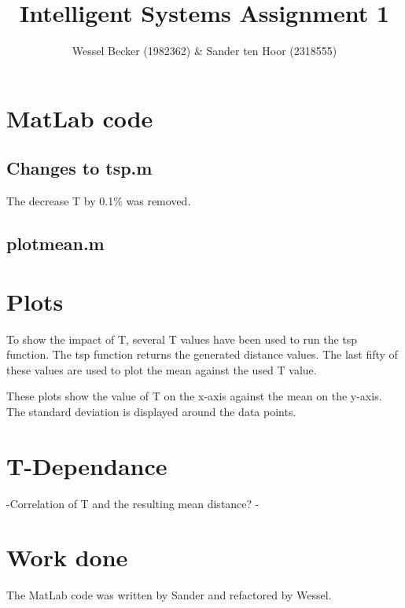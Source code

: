 \documentclass[10pt,a4paper]{article}
\begin{document}
\title{Intelligent Systems Assignment 1}
\author{Wessel Becker (1982362) \& Sander ten Hoor (2318555)}
\maketitle
\section{MatLab code}
\subsection{Changes to tsp.m}
The decrease T by 0.1\% was removed.

\subsection{plotmean.m}


\section{Plots}
To show the impact of T, several T values have been used to run the tsp function. The tsp function returns the generated distance values. The last fifty of these values are used to plot the mean against the used T value.


These plots show the value of T on the x-axis against the mean on the y-axis. The standard deviation is displayed around the data points.


\section{T-Dependance}
-Correlation of T and the resulting mean distance?
-
\section{Work done}
The MatLab code was written by Sander and refactored by Wessel. 
\end{document}

